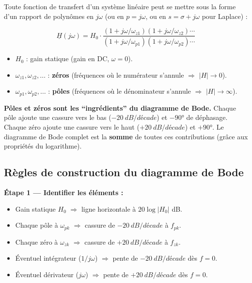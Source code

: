 \documentclass[12pt,a4paper,twoside]{book}
\begin{document}
Toute fonction de transfert d'un système linéaire peut se mettre sous la forme d'un rapport de polynômes en $j\omega$ (ou en $p = j\omega$, ou en $s = \sigma + j\omega$ pour Laplace) :

\begin{formule}
\[
\underline{H}(j\omega) = H_0 \cdot \frac{(1 + j\omega/\omega_{z1})(1 + j\omega/\omega_{z2})\cdots}{(1 + j\omega/\omega_{p1})(1 + j\omega/\omega_{p2})\cdots}
\]
\begin{itemize}[nosep]
\item $H_0$ : gain statique (gain en DC, $\omega = 0$).
\item $\omega_{z1}, \omega_{z2}, \ldots$ : \textbf{zéros} (fréquences où le numérateur s'annule $\Rightarrow$ $|H| \to 0$).
\item $\omega_{p1}, \omega_{p2}, \ldots$ : \textbf{pôles} (fréquences où le dénominateur s'annule $\Rightarrow$ $|H| \to \infty$).
\end{itemize}
\end{formule}

\begin{intuition}
\textbf{Pôles et zéros sont les ``ingrédients'' du diagramme de Bode.} Chaque pôle ajoute une cassure vers le bas ($-\SI{20}{dB/décade}$) et $-90°$ de déphasage. Chaque zéro ajoute une cassure vers le haut ($+\SI{20}{dB/décade}$) et $+90°$. Le diagramme de Bode complet est la \textbf{somme} de toutes ces contributions (grâce aux propriétés du logarithme).
\end{intuition}

\subsection{Règles de construction du diagramme de Bode}

\textbf{Étape 1 --- Identifier les éléments :}
\begin{itemize}[nosep]
\item Gain statique $H_0$ $\Rightarrow$ ligne horizontale à $20\log|H_0|$ dB.
\item Chaque pôle à $\omega_{pk}$ $\Rightarrow$ cassure de $-\SI{20}{dB/décade}$ à $f_{pk}$.
\item Chaque zéro à $\omega_{zk}$ $\Rightarrow$ cassure de $+\SI{20}{dB/décade}$ à $f_{zk}$.
\item Éventuel intégrateur ($1/j\omega$) $\Rightarrow$ pente de $-\SI{20}{dB/décade}$ dès $f = 0$.
\item Éventuel dérivateur ($j\omega$) $\Rightarrow$ pente de $+\SI{20}{dB/décade}$ dès $f = 0$.
\end{itemize}
\end{document}
